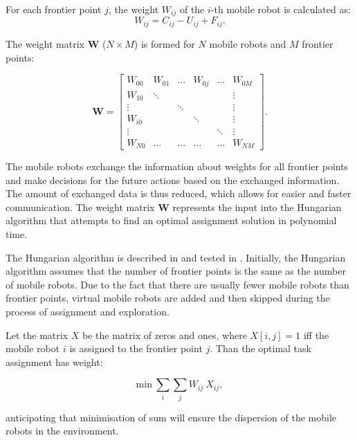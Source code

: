 \documentclass[letterpaper, 10 pt, conference]{ieeeconf}  %
\begin{document}
For each frontier point $j$, the weight $W_{ij}$ of the $i$-th mobile robot is calculated as: 
\begin{equation}
   {W}_{ij}= {C_{ij}} - {U_{ij}} + {F_{ij}}.
   \label{weight}
\end{equation}

The weight matrix $\boldsymbol{W}$ ($N\times M$) is formed for $N$ mobile robots and $M$ frontier points: 

\begin{equation}
    \boldsymbol{W} = \begin{bmatrix}
    W_{00} & W_{01} & \hdots & W_{0j} & \hdots & W_{0M}\\
    W_{10} & \ddots & & & & \vdots\\
    \vdots & & \ddots & & &  \vdots \\
    W_{i0} & & & \ddots & & \vdots \\
    \vdots & & & & \ddots & \vdots\\
    W_{N0} & \hdots  & \hdots  & \hdots  & \hdots &    W_{NM}
    \end{bmatrix}.
\end{equation}

The mobile robots exchange the information about weights for all frontier points and make decisions for the future actions based on the exchanged information. The amount of exchanged data is thus reduced, which allows for easier and faster communication.
The weight matrix $\boldsymbol{W}$ represents the input into the Hungarian algorithm that attempts to find an optimal assignment solution in polynomial time.

The Hungarian algorithm is described in \cite{hungarian} and tested in \cite{comparison}. Initially, the Hungarian algorithm assumes that the number of frontier points is the same as the number of mobile robots. Due to the fact that there are usually fewer mobile robots than frontier points, virtual mobile robots are added and then skipped during the process of assignment and exploration.

Let the matrix $X$ be the matrix of zeros and ones, where $X[i,j]=1$ iff the mobile robot $i$ is assigned to the frontier point $j$.
Than the optimal task assignment has weight:

\begin{equation}
     {\mathrm{min}}\ \sum_{i} \sum_{j} W_{ij}\ X_{ij},
\end{equation}

anticipating that minimisation of sum will ensure the dispersion of the mobile robots in the environment. 
\end{document}
